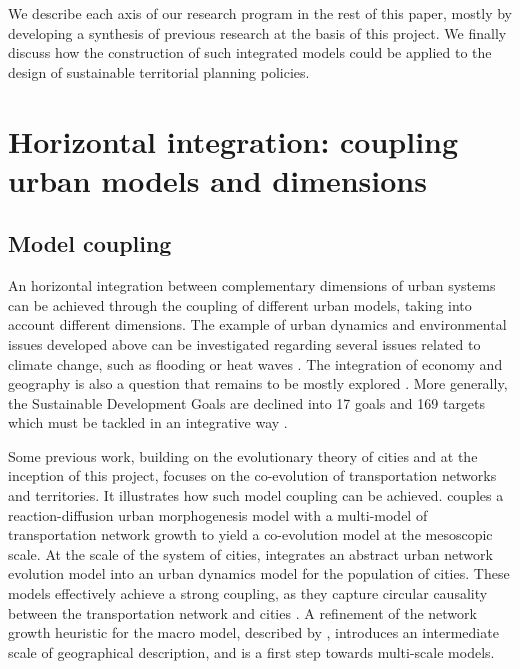 We describe each axis of our research program in the rest of this paper, mostly by developing a synthesis of previous research at the basis of this project. We finally discuss how the construction of such integrated models could be applied to the design of sustainable territorial planning policies.


\section{Horizontal integration: coupling urban models and dimensions}


\subsection{Model coupling}

An horizontal integration between complementary dimensions of urban systems can be achieved through the coupling of different urban models, taking into account different dimensions. The example of urban dynamics and environmental issues developed above can be investigated regarding several issues related to climate change, such as flooding \cite{ford2019multi} or heat waves \cite{lemonsu2015vulnerability}. The integration of economy and geography is also a question that remains to be mostly explored \cite{marchionni2004geographical}. More generally, the Sustainable Development Goals are declined into 17 goals and 169 targets which must be tackled in an integrative way \cite{stafford2017integration}.

Some previous work, building on the evolutionary theory of cities and at the inception of this project, focuses on the co-evolution of transportation networks and territories. It illustrates how such model coupling can be achieved. \cite{raimbault2019urban} couples a reaction-diffusion urban morphogenesis model with a multi-model of transportation network growth to yield a co-evolution model at the mesoscopic scale. At the scale of the system of cities, \cite{raimbault2021modeling} integrates an abstract urban network evolution model into an urban dynamics model for the population of cities. These models effectively achieve a strong coupling, as they capture circular causality between the transportation network and cities \cite{raimbault2020unveiling}. A refinement of the network growth heuristic for the macro model, described by \cite{raimbault2020hierarchy}, introduces an intermediate scale of geographical description, and is a first step towards multi-scale models.

